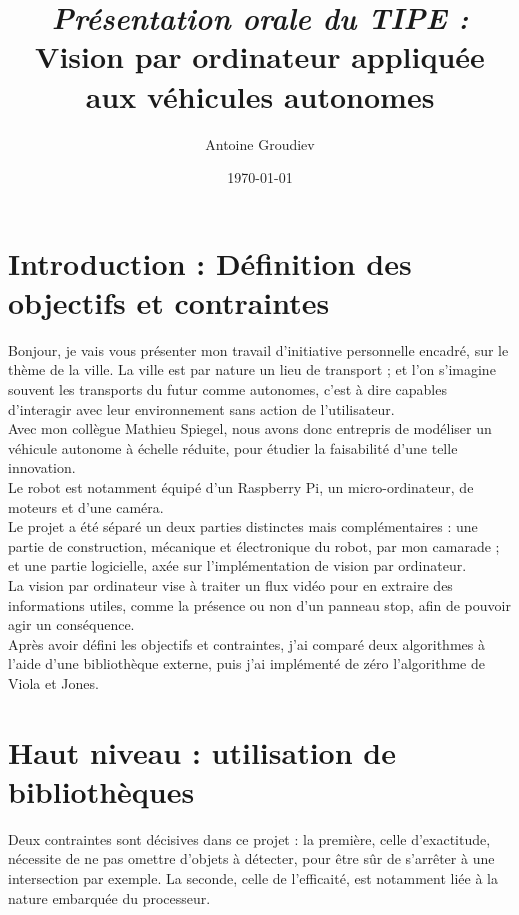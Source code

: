 \documentclass[12pt,a4paper]{article}
\author{Antoine Groudiev}
\title{\textit{Présentation orale du TIPE :} \\ Vision par ordinateur appliquée aux véhicules autonomes}
\date{\today}
\begin{document}
\maketitle



\section*{Introduction : Définition des objectifs et contraintes}
    Bonjour, je vais vous présenter mon travail d'initiative personnelle encadré, sur le thème de la ville. La ville est par nature un lieu de transport ; et l'on s'imagine souvent les transports du futur comme autonomes, c'est à dire capables d'interagir avec leur environnement sans action de l'utilisateur. \\

    Avec mon collègue Mathieu Spiegel, nous avons donc entrepris de modéliser un véhicule autonome à échelle réduite, pour étudier la faisabilité d'une telle innovation. \\

    Le robot est notamment équipé d'un Raspberry Pi, un micro-ordinateur, de moteurs et d'une caméra. \\

    Le projet a été séparé un deux parties distinctes mais complémentaires : une partie de construction, mécanique et électronique du robot, par mon camarade ; et une partie logicielle, axée sur l'implémentation de vision par ordinateur. \\

    La vision par ordinateur vise à traiter un flux vidéo pour en extraire des informations utiles, comme la présence ou non d'un panneau stop, afin de pouvoir agir un conséquence. \\

    Après avoir défini les objectifs et contraintes, j'ai comparé deux algorithmes à l'aide d'une bibliothèque externe, puis j'ai implémenté de zéro l'algorithme de Viola et Jones.

\section{Haut niveau : utilisation de bibliothèques}

    Deux contraintes sont décisives dans ce projet : la première, celle d'exactitude, nécessite de ne pas omettre d'objets à détecter, pour être sûr de s'arrêter à une intersection par exemple. La seconde, celle de l'efficaité, est notamment liée à la nature embarquée du processeur. \\
\end{document}
